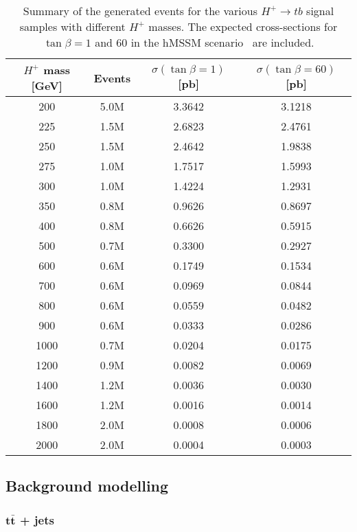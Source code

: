 \begin{table}[htbp]
    \small	
    \begin{tabular}{cccc}
    \toprule\toprule
    $H^+$ mass [GeV] & Events & $\sigma(\tan\beta=1)$ [pb] &  $\sigma(\tan\beta=60)$ [pb] \\ \midrule
    200 & 5.0M & 3.3642 & 3.1218 \\
    225 & 1.5M & 2.6823 & 2.4761 \\
    250 & 1.5M & 2.4642 & 1.9838 \\
    275 & 1.0M & 1.7517 & 1.5993 \\
    300 & 1.0M & 1.4224 & 1.2931 \\
    350 & 0.8M & 0.9626 & 0.8697 \\
    400 & 0.8M & 0.6626 & 0.5915 \\
    500 & 0.7M & 0.3300 & 0.2927 \\
    600 & 0.6M & 0.1749 & 0.1534 \\
    700 & 0.6M & 0.0969 & 0.0844 \\
    800 & 0.6M & 0.0559 & 0.0482 \\
    900 & 0.6M & 0.0333 & 0.0286 \\
    1000 & 0.7M & 0.0204 & 0.0175 \\
    1200 & 0.9M & 0.0082 & 0.0069 \\
    1400 & 1.2M & 0.0036 & 0.0030 \\
    1600 & 1.2M & 0.0016 & 0.0014 \\
    1800 & 2.0M & 0.0008 & 0.0006 \\
    2000 & 2.0M & 0.0004 & 0.0003 \\
    \bottomrule\bottomrule  
    \end{tabular}                            
    \caption{Summary of the generated events for the various $H^+\to tb$ signal samples with different $H^+$ masses. The expected cross-sections for $\tan\beta=1$ and 60 in the hMSSM scenario~\cite{Akeroyd2017} are included.}
    \label{Hplustb:signalsummarytable}
\end{table}

\clearpage

\subsection{Background modelling}

\subsubsection{$\bm{t\bar{t}}$ + jets}

